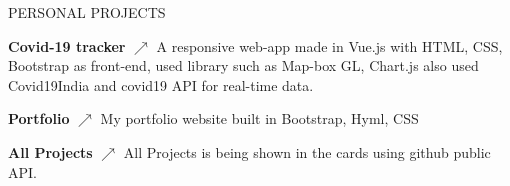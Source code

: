 \documentclass{res} %
\begin{document}
\begin{rSection}{PERSONAL PROJECTS}
 
\item \textbf{Covid-19 tracker} 
\href{https://covid19status.vercel.app/}{\texorpdfstring{\(\nearrow\)}{nearrow}}
{A responsive web-app made in Vue.js with HTML, CSS, Bootstrap as front-end, used library such as Map-box GL,
			Chart.js also used Covid19India and covid19 API for real-time
			data.}


\item \textbf{Portfolio}
\href{https://portfolio.kashif.world/}{\texorpdfstring{\(\nearrow\)}{nearrow}}
{My portfolio website built in Bootstrap, Hyml, CSS}



\item {\bf All Projects}
\href{https://myprojects.vercel.app/}{\texorpdfstring{\(\nearrow\)}{nearrow}}  {All Projects is being shown in the cards using github public API.}
\item 

\end{rSection}
\end{document}
